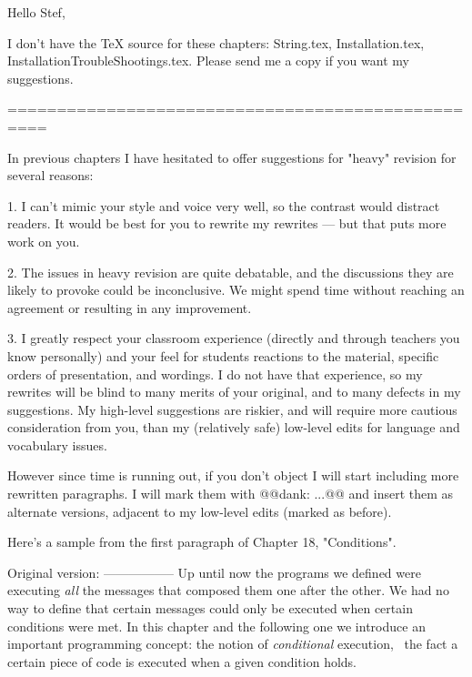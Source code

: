 Hello Stef,

I don't have the TeX source for these chapters:
String.tex, Installation.tex,
InstallationTroubleShootings.tex.  Please send me a
copy if you want my suggestions.

==================================================

In previous chapters I have hesitated to offer
suggestions for "heavy" revision for several reasons:

1. I can't mimic your style and voice very well, so
the contrast would distract readers.  It would be best
for you to rewrite my rewrites --- but that puts more
work on you.

2. The issues in heavy revision are quite debatable,
and the discussions they are likely to provoke could
be inconclusive.  We might spend time without reaching
an agreement or resulting in any improvement.

3. I greatly respect your classroom experience
(directly and through teachers you know personally)
and your feel for students reactions to the material,
specific orders of presentation, and wordings.  I do
not have that experience, so my rewrites will be blind
to many merits of your original, and to many defects
in my suggestions.  My high-level suggestions are
riskier, and will require more cautious consideration
from you, than my (relatively safe) low-level edits
for language and vocabulary issues.

However since time is running out, if you don't object
I will start including more rewritten paragraphs.  I
will mark them with @@dank: ...@@ and insert them as
alternate versions, adjacent  to my low-level edits
(marked as before).  

Here's a sample from the first paragraph of Chapter
18, "Conditions".

Original version:
-----------------
Up until now the programs we defined were executing
\textit{all} the messages that composed them one after
the other. We had no way to define that certain
messages could only be executed when certain
conditions were met. In this chapter and the following
one we introduce an important programming concept: the
notion of \emph{conditional} 
execution, \ie\ the fact a certain piece of code is
executed when a given condition holds.

